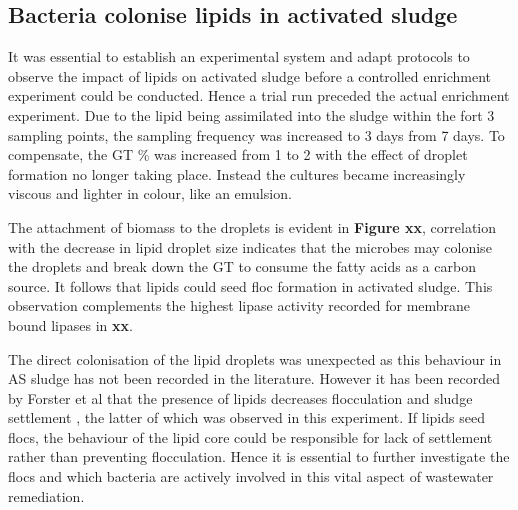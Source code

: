 \documentclass[11pt]{article}
\begin{document}
\subsection{Bacteria colonise lipids in activated sludge}

It was essential to establish an experimental system and adapt protocols to observe the impact of lipids on activated sludge before a controlled enrichment experiment could be conducted. Hence a trial run preceded the actual enrichment experiment. Due to the lipid being assimilated into the sludge within the fort 3 sampling points, the sampling frequency was increased to 3 days from 7 days. To compensate, the GT \% was increased from 1 to 2 with the effect of droplet formation no longer taking place. Instead the cultures became increasingly viscous and lighter in colour, like an emulsion. 


The attachment of biomass to the droplets is evident in \textbf{Figure xx}, correlation with the decrease in lipid droplet size indicates that the microbes may colonise the droplets and break down the GT to consume the fatty acids as a carbon source. It follows that lipids could seed floc formation in activated sludge. This observation complements the highest lipase activity recorded for membrane bound lipases in \textbf{xx}.

The direct colonisation of the lipid droplets was unexpected as this behaviour in AS sludge has not been recorded in the literature. However it has been recorded by Forster et al that the presence of lipids decreases flocculation and sludge settlement \cite{Forster_92}, the latter of which was observed in this experiment. If lipids seed flocs, the behaviour of the lipid core could be responsible for lack of settlement rather than preventing flocculation. Hence it is essential to further investigate the flocs and which bacteria are actively involved in this vital aspect of wastewater remediation.
\end{document}
